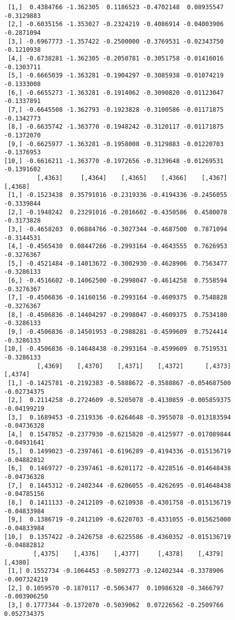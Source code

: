 \documentclass[
  letterpaper,
  DIV=11,
  numbers=noendperiod]{scrreprt}
\begin{document}
\begin{verbatim}
 [1,]  0.4384766 -1.362305  0.1186523 -0.4702148  0.08935547 -0.3129883
 [2,] -0.6035156 -1.353027 -0.2324219 -0.4086914 -0.04003906 -0.2871094
 [3,] -0.6967773 -1.357422 -0.2500000 -0.3769531 -0.02343750 -0.1210938
 [4,] -0.6738281 -1.362305 -0.2050781 -0.3051758 -0.01416016 -0.1303711
 [5,] -0.6665039 -1.363281 -0.1904297 -0.3085938 -0.01074219 -0.1333008
 [6,] -0.6655273 -1.363281 -0.1914062 -0.3090820 -0.01123047 -0.1337891
 [7,] -0.6645508 -1.362793 -0.1923828 -0.3100586 -0.01171875 -0.1342773
 [8,] -0.6635742 -1.363770 -0.1948242 -0.3120117 -0.01171875 -0.1372070
 [9,] -0.6625977 -1.363281 -0.1958008 -0.3129883 -0.01220703 -0.1376953
[10,] -0.6616211 -1.363770 -0.1972656 -0.3139648 -0.01269531 -0.1391602
         [,4363]     [,4364]    [,4365]    [,4366]    [,4367]    [,4368]
 [1,] -0.1523438  0.35791016 -0.2319336 -0.4194336 -0.2456055 -0.3339844
 [2,] -0.1948242  0.23291016 -0.2016602 -0.4350586  0.4580078 -0.3173828
 [3,] -0.4658203  0.06884766 -0.3027344 -0.4687500  0.7871094 -0.3144531
 [4,] -0.4565430  0.08447266 -0.2993164 -0.4643555  0.7626953 -0.3276367
 [5,] -0.4521484 -0.14013672 -0.3002930 -0.4628906  0.7563477 -0.3286133
 [6,] -0.4516602 -0.14062500 -0.2998047 -0.4614258  0.7558594 -0.3276367
 [7,] -0.4506836 -0.14160156 -0.2993164 -0.4609375  0.7548828 -0.3276367
 [8,] -0.4506836 -0.14404297 -0.2998047 -0.4609375  0.7534180 -0.3286133
 [9,] -0.4506836 -0.14501953 -0.2988281 -0.4599609  0.7524414 -0.3286133
[10,] -0.4506836 -0.14648438 -0.2993164 -0.4599609  0.7519531 -0.3286133
         [,4369]    [,4370]    [,4371]    [,4372]      [,4373]     [,4374]
 [1,] -0.1425781 -0.2192383 -0.5888672 -0.3588867 -0.054687500 -0.02734375
 [2,]  0.2114258 -0.2724609 -0.5205078 -0.4130859 -0.005859375 -0.04199219
 [3,]  0.1689453 -0.2319336 -0.6264648 -0.3955078 -0.013183594 -0.04736328
 [4,]  0.1547852 -0.2377930 -0.6215820 -0.4125977 -0.017089844 -0.04931641
 [5,]  0.1499023 -0.2397461 -0.6196289 -0.4194336 -0.015136719 -0.04882812
 [6,]  0.1469727 -0.2397461 -0.6201172 -0.4228516 -0.014648438 -0.04736328
 [7,]  0.1445312 -0.2402344 -0.6206055 -0.4262695 -0.014648438 -0.04785156
 [8,]  0.1411133 -0.2412109 -0.6210938 -0.4301758 -0.015136719 -0.04833984
 [9,]  0.1386719 -0.2412109 -0.6220703 -0.4331055 -0.015625000 -0.04833984
[10,]  0.1357422 -0.2426758 -0.6225586 -0.4360352 -0.015136719 -0.04882812
        [,4375]    [,4376]    [,4377]     [,4378]    [,4379]      [,4380]
 [1,] 0.1552734 -0.1064453 -0.5092773 -0.12402344 -0.3378906 -0.007324219
 [2,] 0.1059570 -0.1870117 -0.5063477  0.10986328 -0.3466797 -0.003906250
 [3,] 0.1777344 -0.1372070 -0.5039062  0.07226562 -0.2509766  0.052734375

\end{verbatim}
\end{document}
